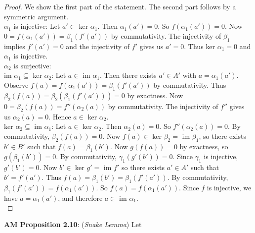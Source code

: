 \documentclass[8pt]{amsart}
\theoremstyle{plain}%
\theoremstyle{definition}
\theoremstyle{remark}
\numberwithin{equation}{section}
\begin{document}
	\begin{proof} We show the first part of the statement. The second part follows by a symmetric argument. \\
	
$\alpha_1$ is injective: Let $a' \in$ ker $\alpha_1$. Then $\alpha_1(a')=0$. So $f(\alpha_1(a'))=0$. Now $0=f(\alpha_1(a'))=\beta_1(f'(a'))$ by commutativity. The injectivity of $\beta_1$ implies $f'(a')=0$ and the injectivity of $f'$ gives us $a'=0$. Thus ker $\alpha_1=0$ and $\alpha_1$ is injective.\\
	
	$\alpha_2$ is surjective: \\
	
	im $\alpha_1\subseteq$ ker $\alpha_2$: Let $a \in$ im $\alpha_1$. Then there exists $a' \in A'$ with $a=\alpha_1(a')$. Observe $f(a)=f(\alpha_1(a'))=\beta_1(f'(a'))$ by commutativity. Thus $\beta_2(f(a))=\beta_2(\beta_1(f'(a')))=0$ by exactness. Now $0=\beta_2(f(a))=f''(\alpha_2(a))$ by commutativity. The injectivity of $f''$ gives us $\alpha_2(a)=0$. Hence $a \in$ ker $\alpha_2$.\\
	
	ker $\alpha_2 \subseteq$ im $\alpha_1$: Let $a  \in$ ker $\alpha_2$. Then $\alpha_2(a)=0$. So $f''(\alpha_2(a))=0$. By commutativity, $\beta_2(f(a))=0$. Now $f(a) \in$ ker $\beta_2 =$ im $\beta_1$, so there exists $b' \in B'$ such that $f(a)=\beta_1(b')$. Now $g(f(a))=0$ by exactness, so $g(\beta_1(b'))=0$. By commutativity, $\gamma_1(g'(b'))=0$. Since $\gamma_1$ is injective, $g'(b')=0$. Now $b' \in$ ker $g'=$ im $f'$ so there exists $a' \in A'$ such that $b'=f'(a')$. Thus $f(a)=\beta_1(b')=\beta_1(f'(a'))$. By commutativity, $\beta_1(f'(a'))=f(\alpha_1(a'))$. So $f(a)=f(\alpha_1(a'))$. Since $f$ is injective, we have $a=\alpha_1(a')$, and therefore $a\in$ im $\alpha_1$. \\
 \end{proof}

\textbf{AM Proposition 2.10}: (\textit{Snake Lemma}) Let

	\begin{center}
	\end{center}
\end{document}
